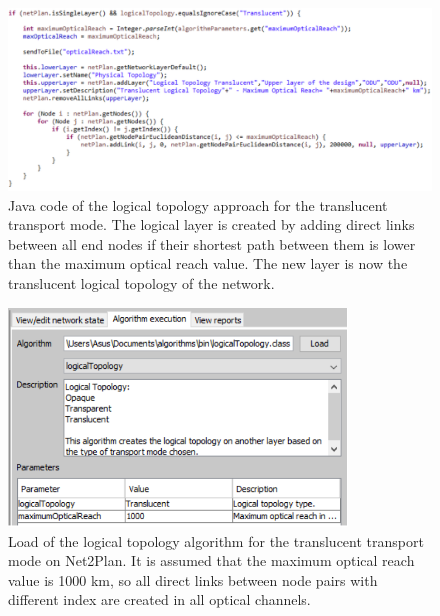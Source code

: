 \begin{figure}[H]
\centering
\includegraphics[width=17cm]{sdf/heuristic/translucent_survivability/figures/logical_topology_creation_translucent}
\caption{Java code of the logical topology approach for the translucent transport mode. The logical layer is created by adding direct links between all end nodes if their shortest path between them is lower than the maximum optical reach value. The new layer is now the translucent logical topology of the network.}
\label{logical_topology_creation_translucent_surv}
\end{figure}

\begin{figure}[H]
\centering
\includegraphics[width=9cm]{sdf/heuristic/translucent_survivability/figures/logical_topology_load_translucent}
\caption{Load of the logical topology algorithm for the translucent transport mode on Net2Plan. It is assumed that the maximum optical reach value is 1000 km, so all direct links between node pairs with different index are created in all optical channels.}
\label{logical_topology_load_translucent_surv}
\end{figure}

